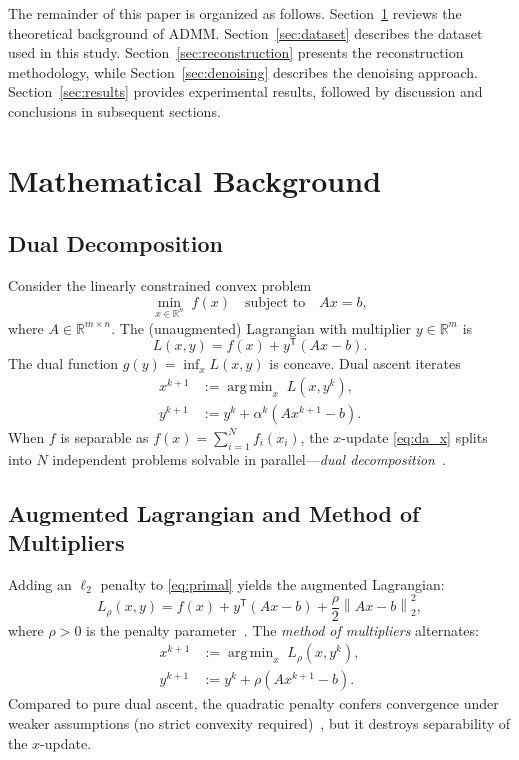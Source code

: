 \documentclass[journal,twoside,10pt]{IEEEtran}
\DeclareMathOperator*{\argmin}{arg\,min}
\newcommand{\norm}[1]{\left\lVert#1\right\rVert}
\newcommand{\R}{\mathbb{R}}
\newcommand{\T}{^{\mathsf{T}}}
\begin{document}
The remainder of this paper is organized as follows. Section~\ref{sec:background} reviews the theoretical background of ADMM. Section~\ref{sec:dataset} describes the dataset used in this study. Section~\ref{sec:reconstruction} presents the reconstruction methodology, while Section~\ref{sec:denoising} describes the denoising approach. Section~\ref{sec:results} provides experimental results, followed by discussion and conclusions in subsequent sections.
\section{Mathematical Background}
\label{sec:background}

\subsection{Dual Decomposition}
\label{ssec:dual_decomp}

Consider the linearly constrained convex problem
\begin{equation}
  \min_{x\in\R^n}\; f(x) \quad \text{subject to}\quad Ax = b,
  \label{eq:primal}
\end{equation}
where $A\in\R^{m\times n}$.  The (unaugmented) Lagrangian with multiplier $y\in\R^m$ is
\begin{equation}
  L(x,y) = f(x) + y\T(Ax - b).
\end{equation}
The dual function $g(y)=\inf_x L(x,y)$ is concave.  Dual ascent iterates
\begin{align}
  x^{k+1} &:= \argmin_x\; L(x,y^k), \label{eq:da_x}\\
  y^{k+1} &:= y^k + \alpha^k (Ax^{k+1}-b). \label{eq:da_y}
\end{align}
When $f$ is separable as $f(x)=\sum_{i=1}^N f_i(x_i)$, the $x$-update \eqref{eq:da_x} splits into $N$
independent problems solvable in parallel---\emph{dual decomposition}~\cite{boyd2011}.

\subsection{Augmented Lagrangian and Method of Multipliers}
\label{ssec:mom}

Adding an $\ell_2$ penalty to \eqref{eq:primal} yields the augmented Lagrangian:
\begin{equation}
  L_\rho(x,y) = f(x) + y\T(Ax-b) + \frac{\rho}{2}\norm{Ax-b}_2^2,
  \label{eq:auglag}
\end{equation}
where $\rho>0$ is the penalty parameter~\cite{hestenes1969,powell1969}.  The \emph{method of multipliers}
alternates:
\begin{align}
  x^{k+1} &:= \argmin_x\; L_\rho(x,y^k), \label{eq:mom_x}\\
  y^{k+1} &:= y^k + \rho(Ax^{k+1}-b). \label{eq:mom_y}
\end{align}
Compared to pure dual ascent, the quadratic penalty confers convergence under weaker assumptions
(no strict convexity required)~\cite{bertsekas1982}, but it destroys separability of the $x$-update.
\end{document}
